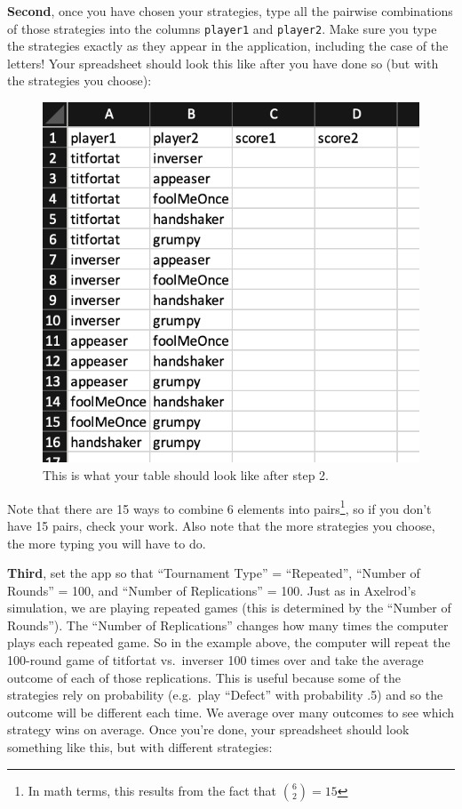 \documentclass[
]{article}
\begin{document}
\textbf{Second}, once you have chosen your strategies, type all the
pairwise combinations of those strategies into the columns
\texttt{player1} and \texttt{player2}. Make sure you type the strategies
exactly as they appear in the application, including the case of the
letters! Your spreadsheet should look this like after you have done so
(but with the strategies you choose):

\begin{figure}
\centering
\includegraphics{./rmd_photos/step2.png}
\caption{This is what your table should look like after step 2.}
\end{figure}

Note that there are 15 ways to combine 6 elements into
pairs\footnote{In math terms, this results from the fact that ${6 \choose 2} = 15$},
so if you don't have 15 pairs, check your work. Also note that the more
strategies you choose, the more typing you will have to do.

\textbf{Third}, set the app so that ``Tournament Type'' = ``Repeated'',
``Number of Rounds'' = 100, and ``Number of Replications'' = 100. Just
as in Axelrod's simulation, we are playing repeated games (this is
determined by the ``Number of Rounds''). The ``Number of Replications''
changes how many times the computer plays each repeated game. So in the
example above, the computer will repeat the 100-round game of titfortat
vs.~inverser 100 times over and take the average outcome of each of
those replications. This is useful because some of the strategies rely
on probability (e.g.~play ``Defect'' with probability .5) and so the
outcome will be different each time. We average over many outcomes to
see which strategy wins on average. Once you're done, your spreadsheet
should look something like this, but with different strategies:
\end{document}
